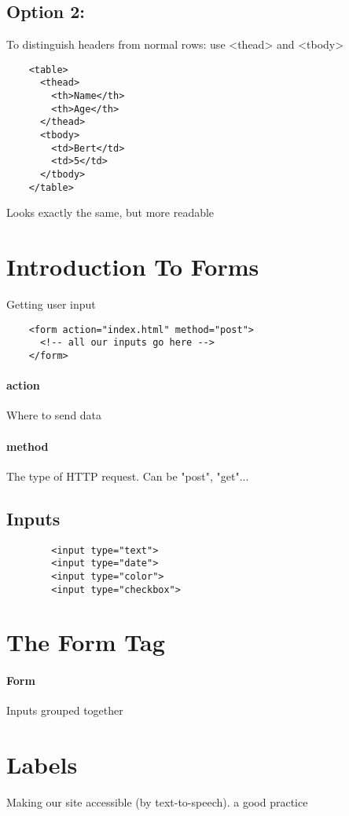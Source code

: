 \documentclass{article}
\begin{document}
	\subsection{Option 2:}
	To distinguish headers from normal rows: use <thead> and <tbody>
	\begin{verbatim}
	<table>
	  <thead>
	    <th>Name</th>
	    <th>Age</th>
	  </thead>
	  <tbody>
	    <td>Bert</td>
	    <td>5</td>
	  </tbody>
	</table>
	\end{verbatim}
	
	Looks exactly the same, but more readable

\section{Introduction To Forms}
	Getting user input

	\begin{verbatim}
	<form action="index.html" method="post">
	  <!-- all our inputs go here -->
	</form>
	\end{verbatim}
	
	\paragraph*{action}
	Where to send data
	\paragraph*{method}
	The type of HTTP request. Can be "post", "get"...
	
	\subsection{Inputs}
	\begin{verbatim}
		<input type="text">
		<input type="date">
		<input type="color">
		<input type="checkbox">
	\end{verbatim}

\section{The Form Tag}
\paragraph*{Form}
Inputs grouped together

\section{Labels}
Making our site accessible (by text-to-speech). a good practice
\end{document}
